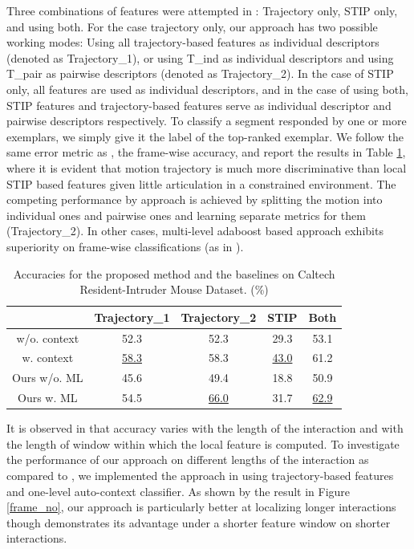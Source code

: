 \documentclass[10pt,twocolumn,letterpaper]{article}
\begin{document}
Three combinations of features were attempted in \cite{CRIM13}: Trajectory only, STIP only, and using both. For the case trajectory only, our approach has two possible working modes: Using all trajectory-based features as individual descriptors (denoted as Trajectory\_1), or using T\_ind as individual descriptors and using T\_pair as pairwise descriptors (denoted as Trajectory\_2). In the case of STIP only, all features are used as individual descriptors, and in the case of using both, STIP features and trajectory-based features serve as individual descriptor and pairwise descriptors respectively. To classify a segment responded by one or more exemplars, we simply give it the label of the top-ranked exemplar. We follow the same error metric as \cite{CRIM13}, the frame-wise accuracy, and report the results in Table \ref{CRIMAccu}, where it is evident that motion trajectory is much more discriminative than local STIP based features given little articulation in a constrained environment. The competing performance by approach is achieved by splitting the motion into individual ones and pairwise ones and learning separate metrics for them (Trajectory\_2). In other cases, multi-level adaboost based approach exhibits superiority on frame-wise classifications (as in \cite{CRIM13}).


\begin{table}[h]
\centering \caption{Accuracies for the proposed method and the baselines on Caltech Resident-Intruder Mouse Dataset. (\%)}
\footnotesize{
\begin{tabular}{|c||c|c|c|c|}
\hline   & Trajectory\_1  & Trajectory\_2 & STIP & Both \\
\hline \cite{CRIM13} w/o. context & 52.3  & 52.3 & 29.3 & 53.1\\
\hline \cite{CRIM13} w. context &  \underline{58.3} & 58.3 & \underline{43.0} & 61.2\\
\hline Ours w/o. ML &  45.6 & 49.4 & 18.8 & 50.9 \\
\hline Ours w. ML & 54.5 & \underline{66.0} & 31.7 & \underline{62.9}\\
\hline 
\end{tabular}
}
\label{CRIMAccu}
\end{table}

It is observed in \cite{CRIM13} that accuracy varies with the length of the interaction and with the length of window within which the local feature is computed. To investigate the performance of our approach on different lengths of the interaction as compared to \cite{CRIM13}, we implemented the approach in \cite{CRIM13} using trajectory-based features and one-level auto-context classifier. As shown by the result in Figure \ref{frame_no}, our approach is particularly better at localizing longer interactions though \cite{CRIM13} demonstrates its advantage under a shorter feature window on shorter interactions. 
\end{document}
